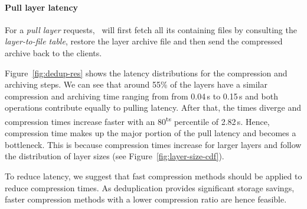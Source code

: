 \paragraph{Pull layer latency} 

For a \emph{pull layer} requests, \sysname\ will first fetch 
all its containing files by consulting the \emph{layer-to-file table}, 
restore the layer archive file and then send the compressed archive back
to the clients.

Figure~\ref{fig:dedup-res} shows the latency distributions for the compression
and archiving steps.
%
%
%
We can see that around 55\% of the layers have a similar compression and archiving
time ranging from from 0.04\,s to 0.15\,s and both operations contribute equally
to pulling latency.
%
%
After that, the times diverge and compression times increase faster with an
80\textsuperscript{ts} percentile of 2.82\,s.
%
Hence, compression time makes up the major portion of the pull latency and becomes a
bottleneck.
%
This is because compression times increase for larger layers and follow the distribution
of layer sizes (see Figure~\ref{fig:layer-size-cdf}).
%

%
To reduce latency, we suggest that fast compression methods should be applied to reduce
compression times. As deduplication provides significant storage savings, faster compression
methods with a lower compression ratio are hence feasible.

%

